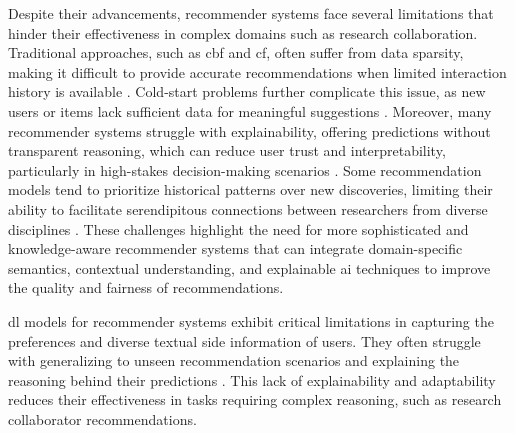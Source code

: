 Despite their advancements, recommender systems face several limitations that hinder their effectiveness in complex domains such as research collaboration.
Traditional approaches, such as \gls{cbf} and \gls{cf}, often suffer from data sparsity, making it difficult to provide accurate recommendations when limited interaction history is available \cite{Plexousakis2005, WEI201729}.
Cold-start problems further complicate this issue, as new users or items lack sufficient data for meaningful suggestions \cite{Lu2012}.
Moreover, many recommender systems struggle with explainability, offering predictions without transparent reasoning, which can reduce user trust and interpretability, particularly in high-stakes decision-making scenarios \cite{AIinRecSys}.
Some recommendation models tend to prioritize historical patterns over new discoveries, limiting their ability to facilitate serendipitous connections between researchers from diverse disciplines \cite{Jagadishwari2023,Iana2021}.
These challenges highlight the need for more sophisticated and knowledge-aware recommender systems that can integrate domain-specific semantics, contextual understanding, and explainable \gls{ai} techniques to improve the quality and fairness of recommendations.
%
\begin{comment}
\section{Thesis Statement}\label{sec:thesis-statement}
This thesis proposes the design and development of a recommendation system that leverages the power of \glspl{kg} and \glspl{llm} to provide accurate and explainable recommendations for identifying potential research collaborators.
By integrating \glspl{kg}, which provide a structured and interconnected representation of domain-specific information, with the contextual understanding and generative capabilities of \glspl{llm}, the system aims to address key challenges of research collaboration recommendations.
These include understanding complex academic relationships between researchers, research projects and areas of interest of researchers, the forming of research consortia, and explaining the motivations behind recommendations.
The proposed system leverage the strengths of both technologies to retrieve and analyze relevant academic data, dynamically adapt to user preferences, and provide personalized and well-justified recommendations, thus enhancing the process of finding and connecting with suitable research collaborators.
\end{comment}
\gls{dl} models for recommender systems exhibit critical limitations in capturing the preferences and diverse textual side information of users.
They often struggle with generalizing to unseen recommendation scenarios and explaining the reasoning behind their predictions \cite{Zhao2024}.
This lack of explainability and adaptability reduces their effectiveness in tasks requiring complex reasoning, such as research collaborator recommendations.

